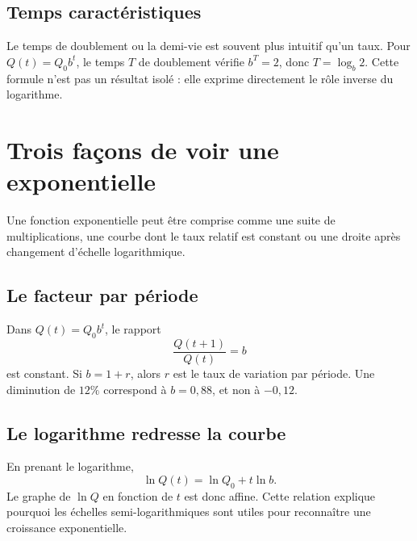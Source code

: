 \documentclass[12pt,a4paper,openany]{book}
\begin{document}
\subsection{Temps caractéristiques}
Le temps de doublement ou la demi-vie est souvent plus intuitif qu'un taux. Pour $Q(t)=Q_0b^t$, le temps $T$ de doublement vérifie $b^T=2$, donc $T=\log_b2$. Cette formule n'est pas un résultat isolé : elle exprime directement le rôle inverse du logarithme.


\section{Trois façons de voir une exponentielle}

Une fonction exponentielle peut être comprise comme une suite de multiplications, une courbe dont le taux relatif est constant ou une droite après changement d'échelle logarithmique.

\subsection{Le facteur par période}
Dans $Q(t)=Q_0b^t$, le rapport
\[
\frac{Q(t+1)}{Q(t)}=b
\]
est constant. Si $b=1+r$, alors $r$ est le taux de variation par période. Une diminution de $12\%$ correspond à $b=0{,}88$, et non à $-0{,}12$.

\subsection{Le logarithme redresse la courbe}
En prenant le logarithme,
\[
\ln Q(t)=\ln Q_0+t\ln b.
\]
Le graphe de $\ln Q$ en fonction de $t$ est donc affine. Cette relation explique pourquoi les échelles semi-logarithmiques sont utiles pour reconnaître une croissance exponentielle.

\begin{center}
\qquad
{}
\end{center}
\end{document}
